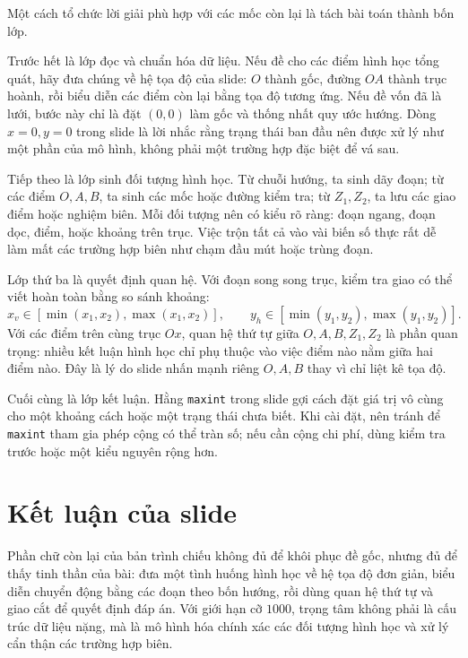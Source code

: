 \documentclass[11pt]{article}
\begin{document}
Một cách tổ chức lời giải phù hợp với các mốc còn lại là tách bài toán thành
bốn lớp.

Trước hết là lớp đọc và chuẩn hóa dữ liệu. Nếu đề cho các điểm hình học tổng
quát, hãy đưa chúng về hệ tọa độ của slide: \(O\) thành gốc, đường \(OA\)
thành trục hoành, rồi biểu diễn các điểm còn lại bằng tọa độ tương ứng. Nếu
đề vốn đã là lưới, bước này chỉ là đặt \((0,0)\) làm gốc và thống nhất quy
ước hướng. Dòng \(x=0,y=0\) trong slide là lời nhắc rằng trạng thái ban đầu
nên được xử lý như một phần của mô hình, không phải một trường hợp đặc biệt
để vá sau.

Tiếp theo là lớp sinh đối tượng hình học. Từ chuỗi hướng, ta sinh dãy đoạn;
từ các điểm \(O,A,B\), ta sinh các mốc hoặc đường kiểm tra; từ \(Z_1,Z_2\),
ta lưu các giao điểm hoặc nghiệm biên. Mỗi đối tượng nên có kiểu rõ ràng:
đoạn ngang, đoạn dọc, điểm, hoặc khoảng trên trục. Việc trộn tất cả vào vài
biến số thực rất dễ làm mất các trường hợp biên như chạm đầu mút hoặc trùng
đoạn.

Lớp thứ ba là quyết định quan hệ. Với đoạn song song trục, kiểm tra giao có
thể viết hoàn toàn bằng so sánh khoảng:
\[
  x_v\in[\min(x_1,x_2),\max(x_1,x_2)],\qquad
  y_h\in[\min(y_1,y_2),\max(y_1,y_2)].
\]
Với các điểm trên cùng trục \(Ox\), quan hệ thứ tự giữa \(O,A,B,Z_1,Z_2\) là
phần quan trọng: nhiều kết luận hình học chỉ phụ thuộc vào việc điểm nào nằm
giữa hai điểm nào. Đây là lý do slide nhấn mạnh riêng \(O,A,B\) thay vì chỉ
liệt kê tọa độ.

Cuối cùng là lớp kết luận. Hằng \texttt{maxint} trong slide gợi cách đặt giá
trị vô cùng cho một khoảng cách hoặc một trạng thái chưa biết. Khi cài đặt,
nên tránh để \texttt{maxint} tham gia phép cộng có thể tràn số; nếu cần cộng
chi phí, dùng kiểm tra trước hoặc một kiểu nguyên rộng hơn.

\section{Kết luận của slide}

Phần chữ còn lại của bản trình chiếu không đủ để khôi phục đề gốc, nhưng đủ
để thấy tinh thần của bài: đưa một tình huống hình học về hệ tọa độ đơn giản,
biểu diễn chuyển động bằng các đoạn theo bốn hướng, rồi dùng quan hệ thứ tự
và giao cắt để quyết định đáp án. Với giới hạn cỡ \(1000\), trọng tâm không
phải là cấu trúc dữ liệu nặng, mà là mô hình hóa chính xác các đối tượng hình
học và xử lý cẩn thận các trường hợp biên.
\end{document}
